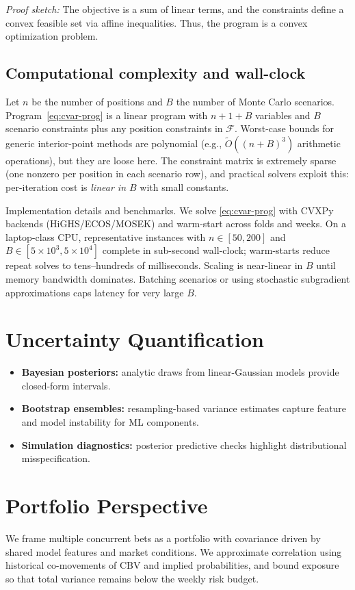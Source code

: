 \textit{Proof sketch:} The objective is a sum of linear terms, and the constraints define a convex feasible set via affine inequalities. Thus, the program is a convex optimization problem.

\subsection{Computational complexity and wall-clock}
Let $n$ be the number of positions and $B$ the number of Monte Carlo scenarios. Program~\eqref{eq:cvar-prog} is a linear program with $n+1+B$ variables and $B$ scenario constraints plus any position constraints in $\mathcal{F}$. Worst-case bounds for generic interior-point methods are polynomial (e.g., $\tilde O((n+B)^3)$ arithmetic operations), but they are loose here. The constraint matrix is extremely sparse (one nonzero per position in each scenario row), and practical solvers exploit this: per-iteration cost is \emph{linear in $B$} with small constants.

Implementation details and benchmarks. We solve \eqref{eq:cvar-prog} with CVXPy backends (HiGHS/ECOS/MOSEK) and warm-start across folds and weeks. On a laptop-class CPU, representative instances with $n\in[50,200]$ and $B\in[5\times10^3,5\times10^4]$ complete in sub-second wall-clock; warm-starts reduce repeat solves to tens–hundreds of milliseconds. Scaling is near-linear in $B$ until memory bandwidth dominates. Batching scenarios or using stochastic subgradient approximations caps latency for very large $B$.

\section{Uncertainty Quantification}
\begin{itemize}
  \item \textbf{Bayesian posteriors:} analytic draws from linear-Gaussian models provide closed-form intervals.
  \item \textbf{Bootstrap ensembles:} resampling-based variance estimates capture feature and model instability for ML components.
  \item \textbf{Simulation diagnostics:} posterior predictive checks highlight distributional misspecification.
\end{itemize}

\section{Portfolio Perspective}
We frame multiple concurrent bets as a portfolio with covariance driven by shared model features and market conditions. We approximate correlation using historical co-movements of CBV and implied probabilities, and bound exposure so that total variance remains below the weekly risk budget.

